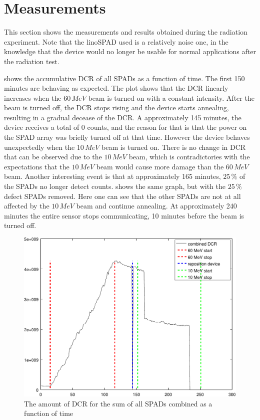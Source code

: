 \section{Measurements}\label{ssec:results}
This section shows the measurements and results obtained during the radiation experiment. Note that the linoSPAD used is a relatively noise one, in the knowledge that the device  would no longer be usable for normal applications after the radiation test.

 shows the accumulative DCR of all SPADs as a function of time. The first 150 minutes are behaving as expected. The plot shows that the DCR linearly increases when the $60\,MeV$ beam  is turned on with a constant intensity. After the beam is turned off, the DCR stops rising and the device starts annealing, resulting in a gradual decease of the DCR. A approximately 145 minutes, the device receives a total of 0 counts, and the reason for that is that the power on the SPAD array was briefly turned off at that time. However the device behaves unexpectedly when the $10\,MeV$ beam is turned on. There is no change in DCR that can be observed due to the $10\,MeV$ beam, which is contradictories with the expectations that the $10\,MeV$ beam would cause more damage than the $60\,MeV$ beam. Another interesting event is that at approximately 165 minutes, $25\,\%$ of the SPADs no longer detect counts.  shows the same graph, but with the $25\,\%$ defect SPADs removed. Here one can see that the other SPADs are not at all affected by the $10\,MeV$ beam and continue annealing. At approximately 240 minutes the entire sensor stops communicating, 10 minutes before the beam is turned off.



\begin{figure}[h]
\centering
	\includegraphics[width=0.6\linewidth]{fig/count_vs_time_sum_all.pdf}
\caption{The amount of DCR for the sum of all SPADs combined as a function of time}
\label{fig:count_vs_time_sum_all}
\end{figure}


